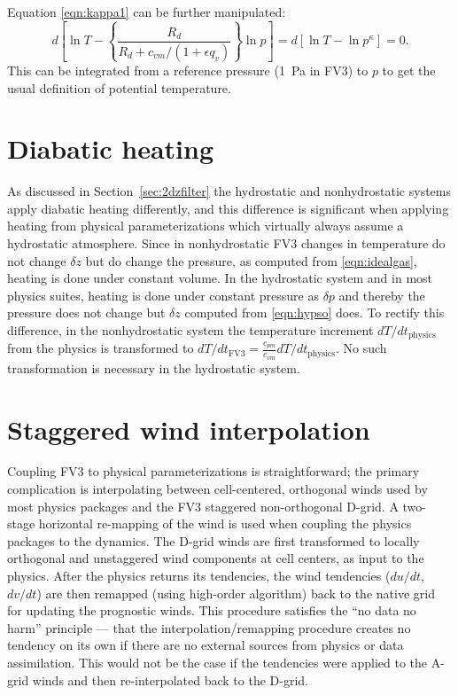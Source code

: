 \documentclass[10pt,letterpaper,margin=1in]{memoir}
\begin{document}
Equation \eqref{eqn:kappa1} can be further manipulated:
\begin{equation} \label{eqn:kappa2}
d\left[  \ln T -  \left \lbrace \frac{R_d}{R_d + c_{vm}/(1+\epsilon q_v) } \right \rbrace \ln p \right ] = d\left[  \ln T - \ln p^\kappa \right ] = 0.
\end{equation}
This can be integrated from a reference pressure (1~Pa in FV3) to $p$ to get the usual definition of potential temperature.

\section{Diabatic heating} \label{sec:diabaticheating}

As discussed in Section~\ref{sec:2dzfilter} the hydrostatic and nonhydrostatic systems apply diabatic heating differently, and this difference is significant when applying heating from physical parameterizations which virtually always assume a hydrostatic atmosphere. Since in nonhydrostatic FV3 changes in temperature do not change $\delta z$ but do change the pressure, as computed from \eqref{eqn:idealgas}, heating is done under constant volume. In the hydrostatic system and in most physics suites, heating is done under constant pressure as $\delta p$ and thereby the pressure does not change but $\delta z$ computed from \eqref{eqn:hypso} does. To rectify this difference, in the nonhydrostatic system the temperature increment $dT/dt_\text{physics}$ from the physics is transformed to $dT/dt_\text{FV3} = \frac{c_{pm}}{c_{vm}} dT/dt_\text{physics}$. No such transformation is necessary in the hydrostatic system.

\section{Staggered wind interpolation}

Coupling FV3 to physical parameterizations is straightforward; the primary complication is interpolating between cell-centered, orthogonal winds used by most physics packages and the FV3 staggered non-orthogonal D-grid.  A two-stage horizontal re-mapping of the wind is used when coupling the physics packages to the dynamics. The D-grid winds are first transformed to locally orthogonal and unstaggered wind components at cell centers, as input to the physics. After the physics returns its tendencies, the wind tendencies ($du/dt$, $dv/dt$) are then remapped (using high-order algorithm) back to the native grid for updating the prognostic winds. This procedure satisfies the ``no data no harm'' principle --- that the interpolation/remapping procedure creates no tendency on its own if there are no external sources from physics or data assimilation. This would not be the case if the tendencies were applied to the A-grid winds and then re-interpolated back to the D-grid.
\end{document}
